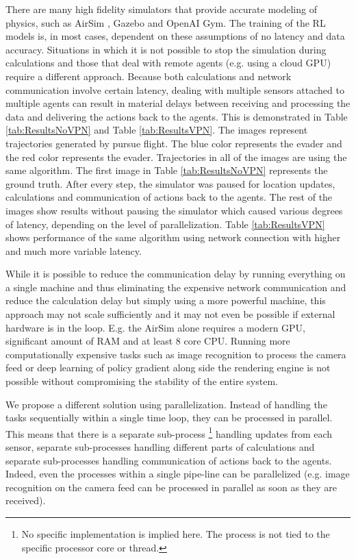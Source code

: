 \documentclass{article}
\begin{document}
There are many high fidelity simulators that provide accurate modeling of physics, such as AirSim \cite{shah2018airsim}, Gazebo and OpenAI Gym. The training of the RL models is, in most cases, dependent on these assumptions of no latency and data accuracy. Situations in which it is not possible to stop the simulation during calculations and those that deal with remote agents (e.g. using a cloud GPU) require a different approach. Because both calculations and network communication involve certain latency, dealing with multiple sensors attached to multiple agents can result in material delays between receiving and processing the data and delivering the actions back to the agents. This is demonstrated in Table \ref{tab:ResultsNoVPN} and Table \ref{tab:ResultsVPN}. The images represent trajectories generated by pursue flight. The blue color represents the evader and the red color represents the evader. Trajectories in all of the images are using the same algorithm. The first image in Table \ref{tab:ResultsNoVPN} represents the ground truth. After every step, the simulator was paused for location updates, calculations and communication of actions back to the agents. The rest of the images show results without pausing the simulator which caused various degrees of latency, depending on the level of parallelization. Table \ref{tab:ResultsVPN} shows performance of the same algorithm using network connection with higher and much more variable latency.

While it is possible to reduce the communication delay by running everything on a single machine and thus eliminating the expensive network communication and reduce the calculation delay but simply using a more powerful machine, this approach may not scale sufficiently and it may not even be possible if external hardware is in the loop. E.g. the AirSim alone requires a modern GPU, significant amount of RAM and at least 8 core CPU. Running more computationally expensive tasks such as image recognition to process the camera feed or deep learning of policy gradient along side the rendering engine is not possible without compromising the stability of the entire system.

We propose a different solution using parallelization. Instead of handling the tasks sequentially within a single time loop, they can be processed in parallel. This means that there is a separate sub-process \footnote{No specific implementation is implied here. The process is not tied to the specific processor core or thread.} handling updates from each sensor, separate sub-processes handling different parts of calculations and separate sub-processes handling communication of actions back to the agents. Indeed, even the processes within a single pipe-line can be parallelized (e.g. image recognition on the camera feed can be processed in parallel as soon as they are received).
\end{document}
